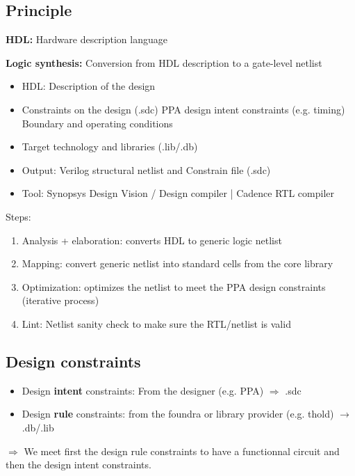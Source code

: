 
\subsection{Principle}

\textbf{HDL:} Hardware description language

\textbf{Logic synthesis:} Conversion from HDL description to a gate-level netlist
\begin{itemize}
  \item HDL: Description of the design
  \item Constraints on the design (.sdc)
    \subitem PPA design intent constraints (e.g. timing)
    \subitem Boundary and operating conditions
  \item Target technology and libraries (.lib/.db)
  \item Output: Verilog structural netlist and Constrain file (.sdc)
    \item Tool: Synopsys Design Vision / Design compiler | Cadence RTL compiler
\end{itemize}

Steps:
\begin{enumerate}
  \item Analysis + elaboration: converts HDL to generic logic netlist
  \item Mapping: convert generic netlist into standard cells from the core library
  \item Optimization: optimizes the netlist to meet the PPA design constraints (iterative process)
  \item Lint: Netlist sanity check to make sure the RTL/netlist is valid
\end{enumerate}



\subsection{Design constraints}
\begin{itemize}
  \item Design \textbf{intent} constraints: From the designer (e.g. PPA) \(\Rightarrow\) .sdc
  \item Design \textbf{rule} constraints: from the foundra or library provider (e.g. thold) \(\rightarrow\) .db/.lib
\end{itemize}

\(\Rightarrow\) We meet first the design rule constraints to have a functionnal circuit and then the design intent constraints.


